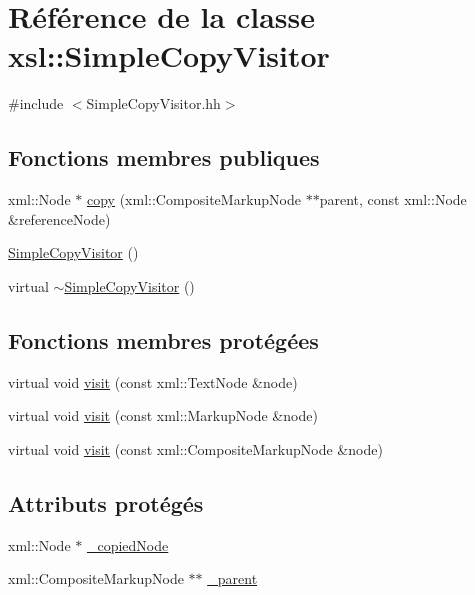 \hypertarget{classxsl_1_1_simple_copy_visitor}{
\section{Référence de la classe xsl::SimpleCopyVisitor}
\label{classxsl_1_1_simple_copy_visitor}
}


{\ttfamily \#include $<$SimpleCopyVisitor.hh$>$}

\subsection*{Fonctions membres publiques}
\begin{DoxyCompactItemize}
\item 
xml::Node $\ast$ \hyperlink{classxsl_1_1_simple_copy_visitor_a635dd86100529983335aa35283450227}{copy} (xml::CompositeMarkupNode $\ast$$\ast$parent, const xml::Node \&referenceNode)
\item 
\hyperlink{classxsl_1_1_simple_copy_visitor_a48310fd852d3993749d46ff2c17ff001}{SimpleCopyVisitor} ()
\item 
virtual \hyperlink{classxsl_1_1_simple_copy_visitor_a35dd73ab468988333fad21aba4502eff}{$\sim$SimpleCopyVisitor} ()
\end{DoxyCompactItemize}
\subsection*{Fonctions membres protégées}
\begin{DoxyCompactItemize}
\item 
virtual void \hyperlink{classxsl_1_1_simple_copy_visitor_a2af765f5955c795d73c5aa6edbe1ae93}{visit} (const xml::TextNode \&node)
\item 
virtual void \hyperlink{classxsl_1_1_simple_copy_visitor_a67f58002edb998f71775c790084ac388}{visit} (const xml::MarkupNode \&node)
\item 
virtual void \hyperlink{classxsl_1_1_simple_copy_visitor_a7afb4e9198dae8246736bed6f15a4b88}{visit} (const xml::CompositeMarkupNode \&node)
\end{DoxyCompactItemize}
\subsection*{Attributs protégés}
\begin{DoxyCompactItemize}
\item 
xml::Node $\ast$ \hyperlink{classxsl_1_1_simple_copy_visitor_a181cd3a2e2aed778efe9fbc8f5fe0bf8}{\_\-copiedNode}
\item 
xml::CompositeMarkupNode $\ast$$\ast$ \hyperlink{classxsl_1_1_simple_copy_visitor_ae812212f02cec65de88cc9dafb7a3cd3}{\_\-parent}
\end{DoxyCompactItemize}


